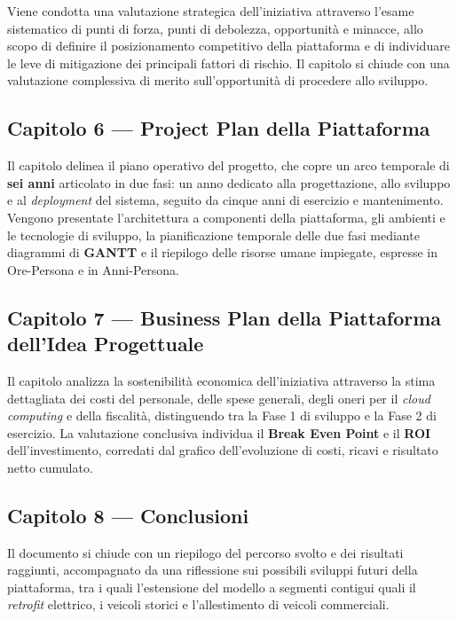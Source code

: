 Viene condotta una valutazione strategica dell'iniziativa attraverso l'esame sistematico di punti di forza, punti di debolezza, opportunit\`a e minacce, allo scopo di definire il posizionamento competitivo della piattaforma e di individuare le leve di mitigazione dei principali fattori di rischio. Il capitolo si chiude con una valutazione complessiva di merito sull'opportunit\`a di procedere allo sviluppo.

\subsection*{Capitolo 6 --- Project Plan della Piattaforma}

Il capitolo delinea il piano operativo del progetto, che copre un arco temporale di \textbf{sei anni} articolato in due fasi: un anno dedicato alla progettazione, allo sviluppo e al \textit{deployment} del sistema, seguito da cinque anni di esercizio e mantenimento. Vengono presentate l'architettura a componenti della piattaforma, gli ambienti e le tecnologie di sviluppo, la pianificazione temporale delle due fasi mediante diagrammi di \textbf{GANTT} e il riepilogo delle risorse umane impiegate, espresse in Ore-Persona e in Anni-Persona.

\subsection*{Capitolo 7 --- Business Plan della Piattaforma dell'Idea Progettuale}

Il capitolo analizza la sostenibilit\`a economica dell'iniziativa attraverso la stima dettagliata dei costi del personale, delle spese generali, degli oneri per il \textit{cloud computing} e della fiscalit\`a, distinguendo tra la Fase 1 di sviluppo e la Fase 2 di esercizio. La valutazione conclusiva individua il \textbf{Break Even Point} e il \textbf{ROI} dell'investimento, corredati dal grafico dell'evoluzione di costi, ricavi e risultato netto cumulato.

\subsection*{Capitolo 8 --- Conclusioni}

Il documento si chiude con un riepilogo del percorso svolto e dei risultati raggiunti, accompagnato da una riflessione sui possibili sviluppi futuri della piattaforma, tra i quali l'estensione del modello a segmenti contigui quali il \textit{retrofit} elettrico, i veicoli storici e l'allestimento di veicoli commerciali.
